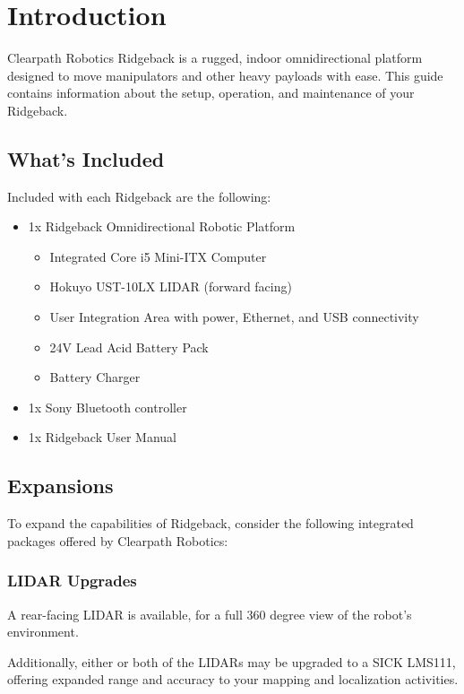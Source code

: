 \documentclass[]{clearpath-latex/clearpath-manual}
\begin{document}
\tableofcontents

\section{Introduction}
Clearpath Robotics Ridgeback is a rugged, indoor omnidirectional platform designed to move manipulators and other heavy payloads with ease. This guide contains information about the setup, operation, and maintenance of your Ridgeback.

\subsection{What's Included}

Included with each Ridgeback are the following:

\begin{itemize}[nolistsep]
  \item 1x Ridgeback Omnidirectional Robotic Platform
  \begin{itemize}
    \item{Integrated Core i5 Mini-ITX Computer}
    \item{Hokuyo UST-10LX LIDAR (forward facing)}
    \item{User Integration Area with power, Ethernet, and USB connectivity}
    \item{24V Lead Acid Battery Pack}
    \item{Battery Charger}
  \end{itemize}
  \item 1x Sony Bluetooth controller
  \item 1x Ridgeback User Manual
\end{itemize}

\subsection{Expansions}

To expand the capabilities of Ridgeback, consider the following integrated packages offered by Clearpath Robotics:

\subsubsection{LIDAR Upgrades}

A rear-facing LIDAR is available, for a full 360 degree view of the robot's environment.

Additionally, either or both of the LIDARs may be upgraded to a SICK LMS111, offering expanded range and accuracy to your mapping and localization activities.
\end{document}
